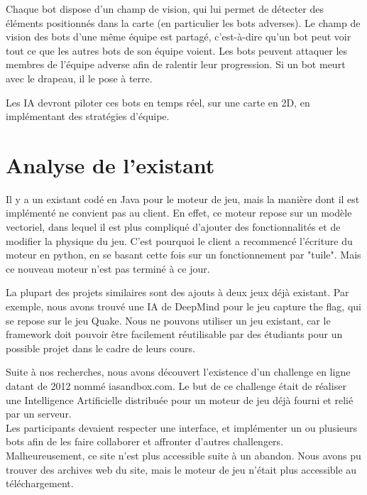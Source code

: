 \documentclass[french]{article}
\begin{document}
Chaque bot dispose d'un champ de vision, qui lui permet de détecter des éléments positionnés dans la carte (en particulier les bots adverses). Le champ de vision des bots d'une même équipe est partagé, c'est-à-dire qu'un bot peut voir tout ce que les autres bots de son équipe voient. Les bots peuvent attaquer les membres de l'équipe adverse afin de ralentir leur progression. Si un bot meurt avec le drapeau, il le pose à terre.
\newline

Les IA devront piloter ces bots en temps réel, sur une carte en 2D, en implémentant des stratégies d'équipe.


\section{Analyse de l'existant}
    
Il y a un existant codé en Java pour le moteur de jeu, mais la manière dont il est implémenté ne convient pas au client. En effet, ce moteur repose sur un modèle vectoriel, dans lequel il est plus compliqué d'ajouter des fonctionnalités et de modifier la physique du jeu. C'est pourquoi le client a recommencé l'écriture du moteur en python, en se basant cette fois sur un fonctionnement par "tuile". Mais ce nouveau moteur n'est pas terminé à ce jour. \newline 

La plupart des projets similaires sont des ajouts à deux jeux déjà existant. Par exemple, nous avons trouvé une IA de DeepMind\cite{Jaderberg859} pour le jeu capture the flag, qui se repose sur le jeu Quake. Nous ne pouvons utiliser un jeu existant, car le framework doit pouvoir être facilement réutilisable par des étudiants pour un possible projet dans le cadre de leurs cours. \newline

Suite à nos recherches, nous avons découvert l'existence d'un challenge en ligne datant de 2012 nommé iasandbox.com. Le but de ce challenge était de réaliser une Intelligence Artificielle distribuée pour un moteur de jeu déjà fourni et relié par un serveur. \\Les participants devaient respecter une interface, et implémenter un ou plusieurs bots afin de les faire collaborer et affronter d'autres challengers. Malheureusement, ce site n'est plus accessible suite à un abandon. Nous avons pu trouver des archives web du site, mais le moteur de jeu n'était plus accessible au téléchargement. \\
\end{document}
